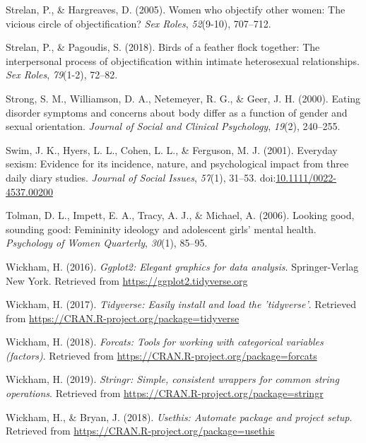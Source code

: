 \documentclass[
  man]{apa6}
\begin{document}
\hypertarget{ref-strelan2005women}{}
Strelan, P., \& Hargreaves, D. (2005). Women who objectify other women:
The vicious circle of objectification? \emph{Sex Roles},
\emph{52}(9-10), 707--712.

\hypertarget{ref-strelan2018birds}{}
Strelan, P., \& Pagoudis, S. (2018). Birds of a feather flock together:
The interpersonal process of objectification within intimate
heterosexual relationships. \emph{Sex Roles}, \emph{79}(1-2), 72--82.

\hypertarget{ref-strong2000eating}{}
Strong, S. M., Williamson, D. A., Netemeyer, R. G., \& Geer, J. H.
(2000). Eating disorder symptoms and concerns about body differ as a
function of gender and sexual orientation. \emph{Journal of Social and
Clinical Psychology}, \emph{19}(2), 240--255.

\hypertarget{ref-swimetal}{}
Swim, J. K., Hyers, L. L., Cohen, L. L., \& Ferguson, M. J. (2001).
Everyday sexism: Evidence for its incidence, nature, and psychological
impact from three daily diary studies. \emph{Journal of Social Issues},
\emph{57}(1), 31--53.
doi:\href{https://doi.org/10.1111/0022-4537.00200}{10.1111/0022-4537.00200}

\hypertarget{ref-tolman2006looking}{}
Tolman, D. L., Impett, E. A., Tracy, A. J., \& Michael, A. (2006).
Looking good, sounding good: Femininity ideology and adolescent girls'
mental health. \emph{Psychology of Women Quarterly}, \emph{30}(1),
85--95.

\hypertarget{ref-R-ggplot2}{}
Wickham, H. (2016). \emph{Ggplot2: Elegant graphics for data analysis}.
Springer-Verlag New York. Retrieved from
\url{https://ggplot2.tidyverse.org}

\hypertarget{ref-R-tidyverse}{}
Wickham, H. (2017). \emph{Tidyverse: Easily install and load the
'tidyverse'}. Retrieved from
\url{https://CRAN.R-project.org/package=tidyverse}

\hypertarget{ref-R-forcats}{}
Wickham, H. (2018). \emph{Forcats: Tools for working with categorical
variables (factors)}. Retrieved from
\url{https://CRAN.R-project.org/package=forcats}

\hypertarget{ref-R-stringr}{}
Wickham, H. (2019). \emph{Stringr: Simple, consistent wrappers for
common string operations}. Retrieved from
\url{https://CRAN.R-project.org/package=stringr}

\hypertarget{ref-R-usethis}{}
Wickham, H., \& Bryan, J. (2018). \emph{Usethis: Automate package and
project setup}. Retrieved from
\url{https://CRAN.R-project.org/package=usethis}
\end{document}
